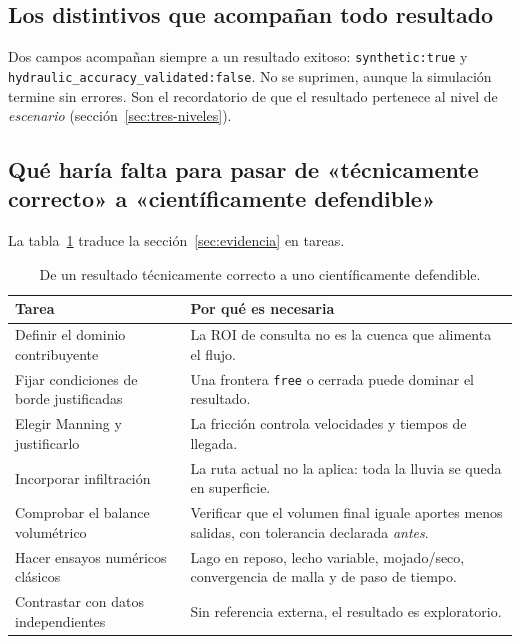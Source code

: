 \documentclass[11pt,a4paper]{article}
\begin{document}
\subsection{Los distintivos que acompañan todo resultado}

Dos campos acompañan siempre a un resultado exitoso: \texttt{synthetic:true} y
\texttt{hydraulic\_accuracy\_validated:false}. No se suprimen, aunque la simulación termine sin errores. Son el
recordatorio de que el resultado pertenece al nivel de \emph{escenario} (sección~\ref{sec:tres-niveles}).

\subsection{Qué haría falta para pasar de «técnicamente correcto» a «científicamente defendible»}

La tabla~\ref{tab:de-tecnico-a-cientifico} traduce la sección~\ref{sec:evidencia} en tareas.

\begin{table}[htbp]
\centering\small
\begin{tabularx}{\linewidth}{p{.27\linewidth}X}
\toprule
\textbf{Tarea} & \textbf{Por qué es necesaria}\\\midrule
Definir el dominio contribuyente & La ROI de consulta no es la cuenca que alimenta el flujo.\\
Fijar condiciones de borde justificadas & Una frontera \texttt{free} o cerrada puede dominar el resultado.\\
Elegir Manning y justificarlo & La fricción controla velocidades y tiempos de llegada.\\
Incorporar infiltración & La ruta actual no la aplica: toda la lluvia se queda en superficie.\\
Comprobar el balance volumétrico & Verificar que el volumen final iguale aportes menos salidas, con tolerancia declarada \emph{antes}.\\
Hacer ensayos numéricos clásicos & Lago en reposo, lecho variable, mojado/seco, convergencia de malla y de paso de tiempo.\\
Contrastar con datos independientes & Sin referencia externa, el resultado es exploratorio.\\\bottomrule
\end{tabularx}
\caption{De un resultado técnicamente correcto a uno científicamente defendible.}
\label{tab:de-tecnico-a-cientifico}
\end{table}
\end{document}
